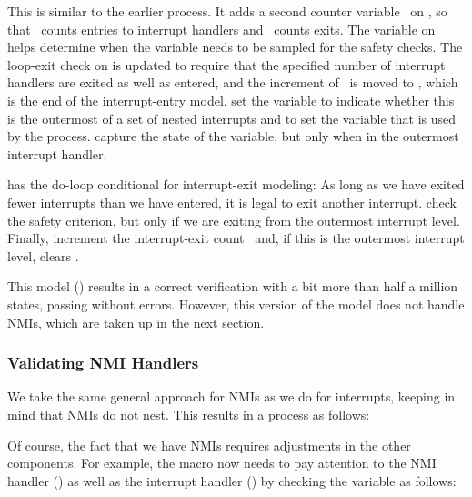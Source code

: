 \begin{fcvref}
This is similar to the earlier  process.
It adds a second counter variable~ on , so that
~counts entries to interrupt handlers and ~counts
exits.
The  variable on  helps determine
when the  variable needs to be sampled
for the safety checks.
The loop-exit check on  is updated to require that the
specified number of interrupt handlers are exited as well as entered,
and the increment of~ is moved to , which is
the end of the interrupt-entry model.
 set the  variable to indicate
whether this is the outermost of a set of nested interrupts and to
set the  variable that is used by the
 process.
 capture the state of the 
variable, but only when in the outermost interrupt handler.

 has the do-loop conditional for interrupt-exit modeling:
As long as we have exited fewer interrupts than we have entered, it is
legal to exit another interrupt.
check the safety criterion, but only if we are exiting
from the outermost interrupt level.
Finally,  increment the interrupt-exit count~
and, if this is the outermost interrupt level, clears
.
\end{fcvref}

This model ()
results in a correct verification with a bit more than half a million
states, passing without errors.
However, this version of the model does not handle NMIs,
which are taken up in the next section.

\subsubsection{Validating NMI Handlers}
\label{sec:formal:Validating NMI Handlers}

We take the same general approach for NMIs as we do for interrupts,
keeping in mind that NMIs do not nest.
This results in a  process as follows:



Of course, the fact that we have NMIs requires adjustments in
the other components.
For example, the  macro now needs to
pay attention to the NMI handler () as well
as the interrupt handler () by checking
the  variable as follows:

